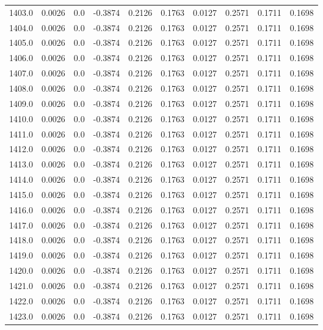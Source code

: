 \begin{longtable}{lrrrrrrrrr}
1403.0 & 0.0026 & 0.0 & -0.3874 & 0.2126 & 0.1763 & 0.0127 & 0.2571 & 0.1711 & 0.1698 \\
1404.0 & 0.0026 & 0.0 & -0.3874 & 0.2126 & 0.1763 & 0.0127 & 0.2571 & 0.1711 & 0.1698 \\
1405.0 & 0.0026 & 0.0 & -0.3874 & 0.2126 & 0.1763 & 0.0127 & 0.2571 & 0.1711 & 0.1698 \\
1406.0 & 0.0026 & 0.0 & -0.3874 & 0.2126 & 0.1763 & 0.0127 & 0.2571 & 0.1711 & 0.1698 \\
1407.0 & 0.0026 & 0.0 & -0.3874 & 0.2126 & 0.1763 & 0.0127 & 0.2571 & 0.1711 & 0.1698 \\
1408.0 & 0.0026 & 0.0 & -0.3874 & 0.2126 & 0.1763 & 0.0127 & 0.2571 & 0.1711 & 0.1698 \\
1409.0 & 0.0026 & 0.0 & -0.3874 & 0.2126 & 0.1763 & 0.0127 & 0.2571 & 0.1711 & 0.1698 \\
1410.0 & 0.0026 & 0.0 & -0.3874 & 0.2126 & 0.1763 & 0.0127 & 0.2571 & 0.1711 & 0.1698 \\
1411.0 & 0.0026 & 0.0 & -0.3874 & 0.2126 & 0.1763 & 0.0127 & 0.2571 & 0.1711 & 0.1698 \\
1412.0 & 0.0026 & 0.0 & -0.3874 & 0.2126 & 0.1763 & 0.0127 & 0.2571 & 0.1711 & 0.1698 \\
1413.0 & 0.0026 & 0.0 & -0.3874 & 0.2126 & 0.1763 & 0.0127 & 0.2571 & 0.1711 & 0.1698 \\
1414.0 & 0.0026 & 0.0 & -0.3874 & 0.2126 & 0.1763 & 0.0127 & 0.2571 & 0.1711 & 0.1698 \\
1415.0 & 0.0026 & 0.0 & -0.3874 & 0.2126 & 0.1763 & 0.0127 & 0.2571 & 0.1711 & 0.1698 \\
1416.0 & 0.0026 & 0.0 & -0.3874 & 0.2126 & 0.1763 & 0.0127 & 0.2571 & 0.1711 & 0.1698 \\
1417.0 & 0.0026 & 0.0 & -0.3874 & 0.2126 & 0.1763 & 0.0127 & 0.2571 & 0.1711 & 0.1698 \\
1418.0 & 0.0026 & 0.0 & -0.3874 & 0.2126 & 0.1763 & 0.0127 & 0.2571 & 0.1711 & 0.1698 \\
1419.0 & 0.0026 & 0.0 & -0.3874 & 0.2126 & 0.1763 & 0.0127 & 0.2571 & 0.1711 & 0.1698 \\
1420.0 & 0.0026 & 0.0 & -0.3874 & 0.2126 & 0.1763 & 0.0127 & 0.2571 & 0.1711 & 0.1698 \\
1421.0 & 0.0026 & 0.0 & -0.3874 & 0.2126 & 0.1763 & 0.0127 & 0.2571 & 0.1711 & 0.1698 \\
1422.0 & 0.0026 & 0.0 & -0.3874 & 0.2126 & 0.1763 & 0.0127 & 0.2571 & 0.1711 & 0.1698 \\
1423.0 & 0.0026 & 0.0 & -0.3874 & 0.2126 & 0.1763 & 0.0127 & 0.2571 & 0.1711 & 0.1698 \\

\end{longtable}
